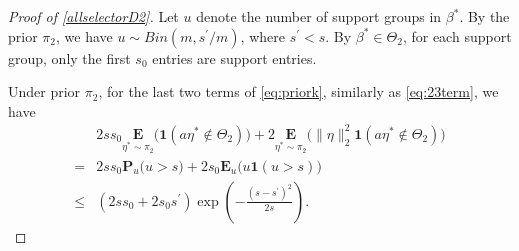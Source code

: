 \documentclass[12pt]{article}
\newtheorem{proof}{Proof}
\begin{document}
\begin{appendix}
\begin{proof}[Proof of \eqref{allselectorD2}]
Let $u$ denote the number of support groups in $\beta^*$.
By the prior $\pi_2$, we have $u \sim Bin(m, s^{\prime} / m)$, where $ s^{\prime} < s$. 
By $\beta^* \in {\Theta}_2$, for each support group, only the first $s_0$ entries are support entries. 

Under prior $\pi_2$, for the last two terms of \eqref{eq:priork}, similarly as \eqref{eq:23term}, we have 
\begin{equation}
 \begin{aligned}
&2 ss_0 \underset{\eta^* \sim \pi_2}{\mathbf E} \big( \mathbf1(a\eta^* \notin {\Theta}_2) \big) + 2 \underset{\eta^* \sim \pi_2}{\mathbf E} \big( \|\eta\|_2^2 \mathbf1( a\eta^* \notin {\Theta}_2) \big)\\
=& 2ss_0 \mathbf P_{u} \Big( u > s\Big)
    + 2s_0 \mathbf E_{u} \Big( u\mathbf1(u>s) \Big)\\
\le& (2ss_0+2s_0s^\prime)\exp\left(-\frac{(s-s^\prime)^2}{2s} \right).
\end{aligned}
\end{equation}


\end{proof}
\end{appendix}
\end{document}
